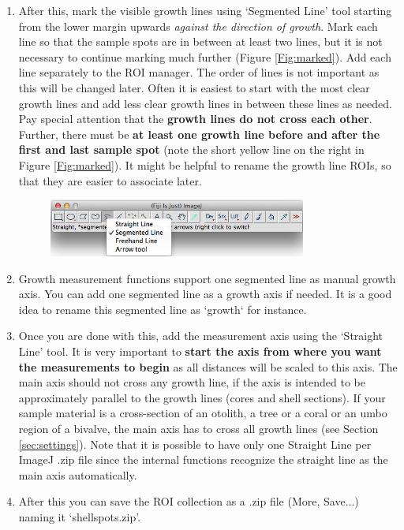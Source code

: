 \documentclass[11pt, a4paper]{article}
\begin{document}
\begin{enumerate}
\begin{figure}[H]
\begin{center}
\end{center}
\end{figure}
\item After this, mark the visible growth lines using `Segmented Line' tool starting from the lower margin upwards \textit{against the direction of growth}. Mark each line so that the sample spots are in between at least two lines, but it is not necessary to continue marking much further (Figure \ref{Fig:marked}). Add each line separately to the ROI manager. The order of lines is not important as this will be changed later. Often it is easiest to start with the most clear growth lines and add less clear growth lines in between these lines as needed. Pay special attention that the \textbf{growth lines do not cross each other}. Further, there must be \textbf{at least one growth line before and after the first and last sample spot} (note the short yellow line on the right in Figure \ref{Fig:marked}). It might be helpful to rename the growth line ROIs, so that they are easier to associate later.
\begin{figure}[H]
\begin{center}
\includegraphics[width = 0.8\textwidth]{segmented_line.png}
\end{center}
\end{figure}
\item Growth measurement functions support one segmented line as manual growth axis. You can add one segmented line as a growth axis if needed. It is a good idea to rename this segmented line as `growth` for instance.
\item Once you are done with this, add the measurement axis using the `Straight Line' tool. It is very important to \textbf{start the axis from where you want the measurements to begin} as all distances will be scaled to this axis. The main axis should not cross any growth line, if the axis is intended to be approximately parallel to the growth lines (cores and shell sections). If your sample material is a cross-section of an otolith, a tree or a coral or an umbo region of a bivalve, the main axis has to cross all growth lines (see Section \ref{sec:settings}). Note that it is possible to have only one Straight Line per ImageJ .zip file since the internal functions recognize the straight line as the main axis automatically.
\item After this you can save the ROI collection as a .zip file (More, Save...) naming it `shellspots.zip'.
\end{enumerate}
\end{document}

